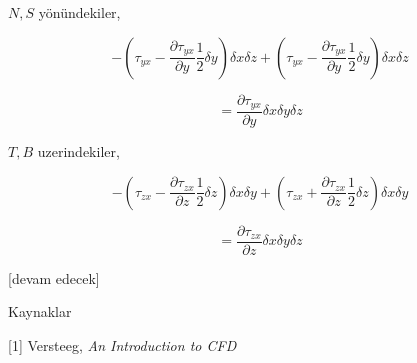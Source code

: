 \documentclass[12pt,fleqn]{article}\usepackage{../../common}
\begin{document}
$N,S$ yönündekiler,

$$
- \left( \tau_{yx} - \frac{\partial \tau_{yx}}{\partial y}  \frac{1}{2} \delta y
\right) \delta x \delta z  +
\left( \tau_{yx} - \frac{\partial \tau_{yx}}{\partial y}  \frac{1}{2} \delta y
\right) \delta x \delta z  
$$

$$
= \frac{\partial \tau_{yx}}{\partial y} \delta x \delta y \delta z 
$$

$T,B$ uzerindekiler,

$$
- \left(
\tau_{zx} - \frac{\partial \tau_{zx}}{\partial z} \frac{1}{2} \delta z
\right) \delta x \delta y +
\left(
\tau_{zx} + \frac{\partial \tau_{zx}}{\partial z} \frac{1}{2} \delta z
\right) \delta x \delta y 
$$

$$
= \frac{\partial \tau_{zx}}{\partial z} \delta x \delta y \delta z 
$$


[devam edecek]

Kaynaklar

[1] Versteeg, {\em An Introduction to CFD}
\end{document}
